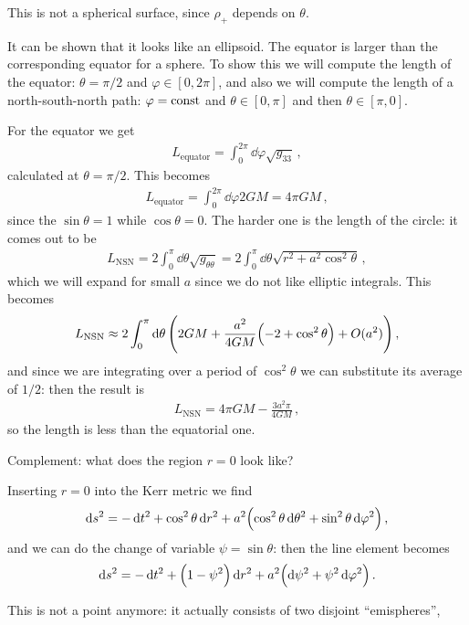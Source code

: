 \documentclass[main.tex]{subfiles}
\begin{document}
This is not a spherical surface, since \(\rho_{+}\) depends on \(\theta \). 

It can be shown that it looks like an ellipsoid. The equator is larger than the corresponding equator for a sphere. To show this we will compute the length of the equator: \(\theta = \pi /2\) and \(\varphi \in [0, 2 \pi ]\), and also we will compute the length of a north-south-north path: \(\varphi = \text{const}\) and \(\theta \in [0, \pi ]\) and then \(\theta \in [\pi , 0]\).

For the equator we get 
%
\begin{align}
  L _{\text{equator}} = \int_{0}^{2 \pi } \dd{\varphi } \sqrt{g_{33}}
\,,
\end{align}
%
calculated at \(\theta = \pi /2\). This becomes 
%
\begin{align}
  L _{\text{equator}} = \int_{0}^{2 \pi } \dd{\varphi } 2GM = 4 \pi GM
\,,
\end{align}
%
since the \(\sin \theta = 1\) while \(\cos \theta = 0\). The harder one is the length of the circle: it comes out to be 
%
\begin{align}
  L _{\text{NSN}} = 2 \int_{0}^{\pi }  \dd{\theta } \sqrt{g_{\theta \theta }}
  = 2 \int_{0}^{\pi } \dd{\theta } \sqrt{r^2 + a^2 \cos^2\theta }
\,,
\end{align}
%
which we will expand for small \(a\) since we do not like elliptic integrals. This becomes 
%
\begin{align}
  L _{\text{NSN}} \approx 2 \int_{0}^{\pi } \dd{\theta } \qty(2GM + \frac{a^2}{4GM} \qty(-2 + \cos^2 \theta )  + O(a^2))
\,,
\end{align}
%
and since we are integrating over a period of \(\cos^2\theta\) we can substitute its average of \(1/2\): then the result is 
%
\begin{align}
L _{\text{NSN}}  = 4\pi GM - \frac{3a^2 \pi }{4GM}
\,,
\end{align}
%
so the length is less than the equatorial one. 

\begin{bluebox}
Complement: what does the region \(r=0\) look like? 

Inserting \(r=0\) into the Kerr metric we find 
%
\begin{align}
  \dd{s^2} = - \dd{t^2} + \cos^2\theta \dd{r^2}
  + a^2 \qty(\cos^2 \theta \dd{\theta^2} + \sin^2 \theta \dd{\varphi^2})
\,,
\end{align}
%
and we can do the change of variable \(\psi = \sin \theta \): then the line element becomes 
%
\begin{align}
  \dd{s^2} = - \dd{t^2} + \qty(1 - \psi^2) \dd{r^2} +a^2 \qty(\dd{\psi^2} + \psi^2 \dd{\varphi^2})
\,.
\end{align}

This is not a point anymore: it actually consists of two disjoint ``emispheres'', 

\end{bluebox}
\end{document}
